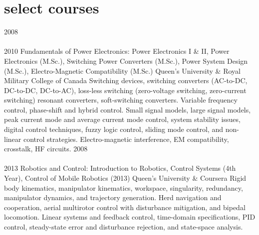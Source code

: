 
\section{select courses}

\begin{entrylist}
\entry
  {2008\\\faChevronDown\\2010}
  {Fundamentals of Power Electronics: Power Electronics I \& II, Power Electronics (M.Sc.), Switching Power Converters (M.Sc.), Power System Design (M.Sc.), Electro-Magnetic Compatibility (M.Sc.)}
  {Queen's University \& Royal Military College of Canada}
  {Switching devices, switching converters (AC-to-DC, DC-to-DC, DC-to-AC), 
  loss-less switching (zero-voltage switching, zero-current switching) resonant converters, soft-switching converters. 
  Variable frequency control, phase-shift and hybrid control. Small signal 
  models, large signal models, peak current mode and average current mode control, system stability issues, 
  digital control techniques, fuzzy logic control, sliding mode control, and non-linear control strategies. 
  Electro-magnetic interference, EM compatibility, crosstalk, HF circuits.}
\entry
  {2008\\\faChevronDown\\2013}
  {Robotics and Control: Introduction to Robotics, Control Systems (4th Year), Control of Mobile Robotics (2013)}
  {Queen's University \& Coursera}
  {Rigid body kinematics, manipulator kinematics, workspace, singularity, redundancy, 
  manipulator dynamics, and trajectory generation. Herd navigation and cooperation, aerial multirotor control with disturbance
  mitigation, and bipedal locomotion. Linear systems and feedback control, time-domain specifications, 
  PID control, steady-state error and disturbance rejection, and state-space analysis.}
\end{entrylist}